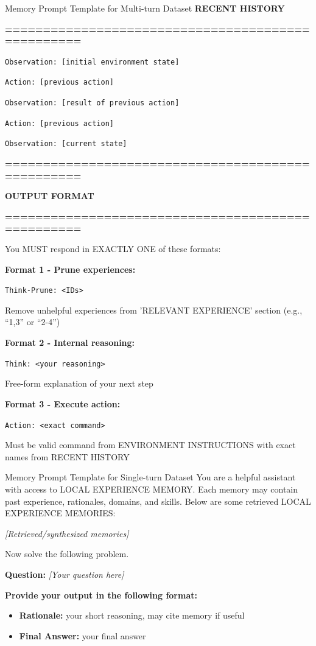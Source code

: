 \begin{prompt}{Memory Prompt Template for Multi-turn Dataset}
\textbf{RECENT HISTORY}

\textbf{==================================================}

\texttt{Observation: [initial environment state]}

\texttt{Action: [previous action]}

\texttt{Observation: [result of previous action]}

\texttt{Action: [previous action]}

\texttt{Observation: [current state]}

\vspace{12pt}
\textbf{==================================================}

\textbf{OUTPUT FORMAT}

\textbf{==================================================}

You MUST respond in EXACTLY ONE of these formats:

\vspace{8pt}
\textbf{Format 1 - Prune experiences:}

\texttt{Think-Prune: <IDs>}

Remove unhelpful experiences from 'RELEVANT EXPERIENCE' section (e.g., ``1,3'' or ``2-4'')

\vspace{8pt}
\textbf{Format 2 - Internal reasoning:}

\texttt{Think: <your reasoning>}

Free-form explanation of your next step

\vspace{8pt}
\textbf{Format 3 - Execute action:}

\texttt{Action: <exact command>}

Must be valid command from ENVIRONMENT INSTRUCTIONS with exact names from RECENT HISTORY


\end{prompt}



\begin{prompt}{Memory Prompt Template for Single-turn Dataset}
You are a helpful assistant with access to LOCAL EXPERIENCE MEMORY. Each memory may contain past experience, rationales, domains, and skills. Below are some retrieved LOCAL EXPERIENCE MEMORIES:

\vspace{6pt}
\textit{[Retrieved/synthesized memories]}

\vspace{6pt}
Now solve the following problem.

\textbf{Question:} \textit{[Your question here]}

\vspace{6pt}
\noindent\textbf{Provide your output in the following format:}
\begin{itemize}
  \item \textbf{Rationale:} your short reasoning, may cite memory if useful
  \item \textbf{Final Answer:} your final answer
\end{itemize}
\end{prompt}


